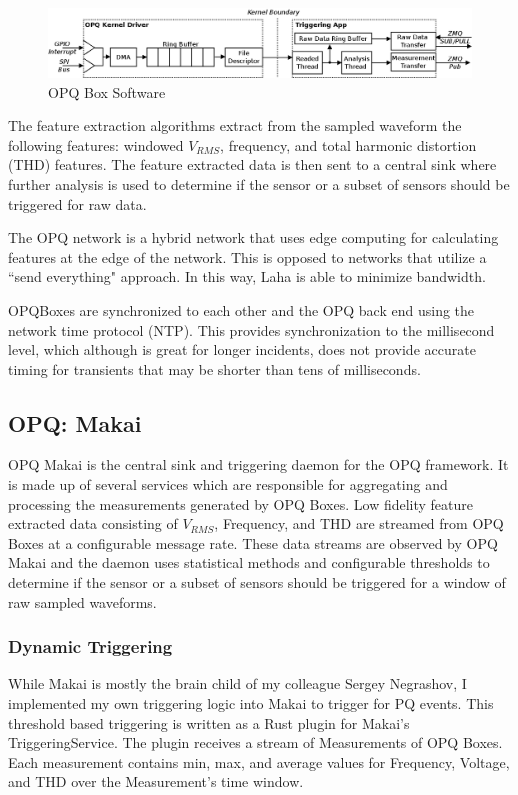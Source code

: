 \begin{figure}
	\centering
	\includegraphics[width=.75\linewidth]{figures/opqbox_software.png}
	\caption{OPQ Box Software}\label{fig:opq-box-software}
\end{figure}

The feature extraction algorithms extract from the sampled waveform the following features: windowed $V_{RMS}$, frequency, and total harmonic distortion (THD) features. The feature extracted data is then sent to a central sink where further analysis is used to determine if the sensor or a subset of sensors should be triggered for raw data.

The OPQ network is a hybrid network that uses edge computing for calculating features at the edge of the network. This is opposed to networks that utilize a ``send everything" approach. In this way, Laha is able to minimize bandwidth.

OPQBoxes are synchronized to each other and the OPQ back end using the network time protocol (NTP). This provides synchronization to the millisecond level, which although is great for longer incidents, does not provide accurate timing for transients that may be shorter than tens of milliseconds.

\subsection{OPQ: Makai}\label{subsec:opq:-makai}
OPQ Makai is the central sink and triggering daemon for the OPQ framework. It is made up of several services which are responsible for aggregating and processing the measurements generated by OPQ Boxes. Low fidelity feature extracted data consisting of $V_{RMS}$, Frequency, and THD are streamed from OPQ Boxes at a configurable message rate. These data streams are observed by OPQ Makai and the daemon uses statistical methods and configurable thresholds to determine if the sensor or a subset of sensors should be triggered for a window of raw sampled waveforms.

\subsubsection{Dynamic Triggering}\label{subsubsec:dynamic-triggering}

While Makai is mostly the brain child of my colleague Sergey Negrashov, I implemented my own triggering logic into Makai to trigger for PQ events. This threshold based triggering is written as a Rust plugin for Makai's TriggeringService. The plugin receives a stream of Measurements of OPQ Boxes. Each measurement contains min, max, and average values for Frequency, Voltage, and THD over the Measurement's time window.

